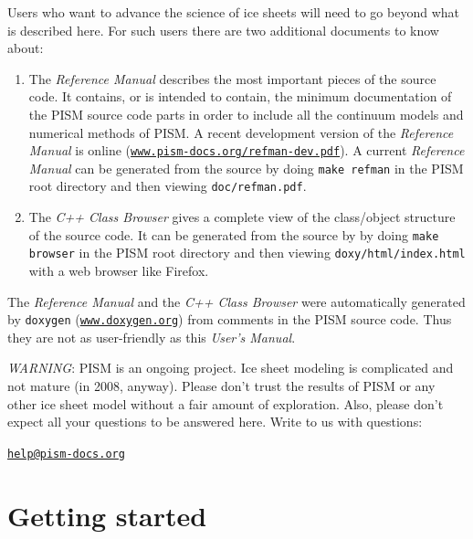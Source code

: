 \documentclass[11pt,final]{amsart}
\renewcommand{\t}[1]{\texttt{#1}}
\begin{document}
Users who want to advance the science of ice sheets will need to go beyond what is described here.  For such users there are two additional documents to know about:
\begin{enumerate}
 \item  The \emph{Reference Manual}
describes the most important pieces of the source code.  It contains, or is intended to contain, the minimum documentation of the PISM source code parts in order to include all the continuum models and numerical methods of PISM.  A recent development version of the \emph{Reference Manual} is online (\href{http://www.pism-docs.org/refman-dev.pdf}{\t{www.pism-docs.org/refman-dev.pdf}}).  A current \emph{Reference Manual} can be generated from the source by doing \verb|make refman| in the PISM root directory and then viewing \verb|doc/refman.pdf|.
 \item  The \emph{C++ Class Browser} gives a complete view of the class/object structure of the source code.  It can be generated from the source by by doing \verb|make browser| in the PISM root directory and then viewing \verb|doxy/html/index.html| with a web browser like Firefox.
\end{enumerate}
The \emph{Reference Manual} and the \emph{C++ Class Browser} were automatically generated by \verb|doxygen| (\href{http://www.doxygen.org/}{\t{www.doxygen.org}}) from comments in the PISM source code.  Thus they are not as user-friendly as this \emph{User's Manual}.

\vspace{1.5in}
\large
\begin{center}
 \emph{WARNING}:  PISM is an ongoing project.  Ice sheet modeling is complicated and not mature (in 2008, anyway).  Please don't trust the results of PISM or any other ice sheet model without a fair amount of exploration.  Also, please don't expect all your questions to be answered here.  Write to us with questions: 

\bigskip

\href{mailto:help@pism-docs.org}{\texttt{help@pism-docs.org}}
\normalsize
\end{center}
\normalsize


\clearpage\newpage
\section{Getting started}\label{sect:start}
\end{document}
